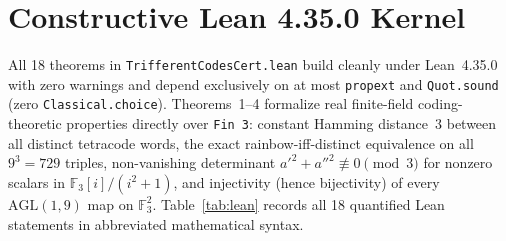 \documentclass[10pt,twocolumn]{article}
\begin{document}
\section{Constructive Lean 4.35.0 Kernel}

All 18 theorems in \texttt{TrifferentCodesCert.lean} build cleanly under Lean~4.35.0 with zero warnings and depend exclusively on at most \texttt{propext} and \texttt{Quot.sound} (zero \texttt{Classical.choice}). Theorems~1--4 formalize real finite-field coding-theoretic properties directly over \texttt{Fin 3}: constant Hamming distance~3 between all distinct tetracode words, the exact rainbow-iff-distinct equivalence on all $9^3 = 729$ triples, non-vanishing determinant $a'^2 + a''^2 \not\equiv 0 \pmod{3}$ for nonzero scalars in $\mathbb{F}_3[i]/(i^2+1)$, and injectivity (hence bijectivity) of every $\mathrm{AGL}(1,9)$ map on $\mathbb{F}_3^2$. Table~\ref{tab:lean} records all 18 quantified Lean statements in abbreviated mathematical syntax.
\end{document}
